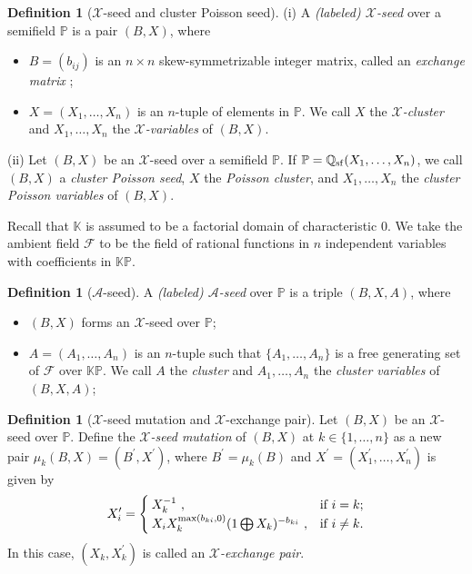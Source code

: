 \documentclass{amsart}
\theoremstyle{definition}
\newtheorem{definition}[theorem]{Definition}
\theoremstyle{remark}
\numberwithin{equation}{section}
\begin{document}
\begin{definition}[$\mathscr X$-seed and cluster Poisson seed]



(i) A {\em (labeled) $\mathscr X$-seed}  over a semifield $\mathbb P$ is a pair $(B,X)$, where
\begin{itemize}
\item $B=(b_{ij})$ is an $n\times n$  skew-symmetrizable integer matrix, called an {\em exchange matrix };


\item $X=(X_1,\ldots,X_n)$ is an $n$-tuple of elements in $\mathbb P$. We call $X$ the {\em  $\mathscr X$-cluster} and  $X_1,\ldots,X_n$ the {\em  $\mathscr X$-variables} of  $(B,X)$.
\end{itemize}

(ii) Let $(B,X)$ be an $\mathscr X$-seed over a semifield $\mathbb P$. If $\mathbb P=\mathbb Q_{\rm sf}(X_1,\ldots,X_n)$, we call $(B,X)$ a {\em cluster Poisson seed}, $X$ the {\em Poisson cluster}, and $X_1,\ldots,X_n$ the {\em cluster Poisson variables} of $(B,X)$.

\end{definition}

Recall that $\mathbb K$ is assumed to be a factorial domain of characteristic $0$. We take the ambient field $\mathcal F$  to be the field of rational functions in $n$ independent variables with coefficients in $\mathbb {KP}$.

\begin{definition}[$\mathscr A$-seed]
  A {\em (labeled)  $\mathscr A$-seed}  over $\mathbb P$ is a triple $(B, X, A)$, where
\begin{itemize}
\item $(B, X)$ forms an  $\mathscr X$-seed over $\mathbb P$;

\item  $A=(A_1,\dots, A_n)$ is an $n$-tuple such that $\{A_1,\dots, A_n\}$ is a free generating set of $\mathcal F$ over $\mathbb{KP}$. We call $A$  the {\em cluster}  and $A_1,\dots,A_n$ the {\em cluster variables}  of  $(B, X, A)$;
\end{itemize}
\end{definition}


\begin{definition}[$\mathscr X$-seed mutation and $\mathscr X$-exchange pair]
Let $(B,X)$ be an   $\mathscr X$-seed over $\mathbb P$.  Define the {\em  $\mathscr X$-seed mutation}  of  $(B,X)$ at  $k\in\{1,\ldots,n\}$ as a new pair $\mu_k(B,X)=(B^\prime, X^{\prime})$, where $B^\prime=\mu_k(B)$ and $X^\prime=(X_1^\prime,\ldots,X_n^\prime)$ is given by
\begin{eqnarray}
 X_i^{\prime}=\begin{cases} X_k^{-1}~,&\text{if } i=k;\\ X_iX_k^{{\rm max}(b_{ki},0)}(1\bigoplus X_k)^{-b_{ki}}~,&\text{if }i\neq k.
\end{cases}\nonumber
\end{eqnarray}
In this case, $(X_k,X_k^\prime)$ is called an {\em  $\mathscr X$-exchange pair}.
\end{definition}
\end{document}
